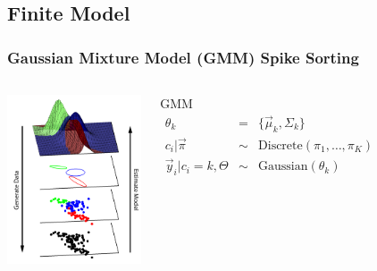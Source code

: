 \documentclass{beamer}
\begin{document}
\subsection{Finite Model}
\begin{frame}
\frametitle{ Gaussian Mixture Model (GMM) Spike Sorting \citep{Lewicki1994}}
\begin{columns}[top]
\begin{center}
		\includegraphics[height=5cm]{figures/generative_model_schematic.pdf}
\end{center}
\begin{block}{GMM}
{\tiny
\begin{eqnarray*}
\theta_k &=& \{\vec \mu_k,\Sigma_k\} \\
c_i | \vec \pi &\sim& \mbox{Discrete}(\pi_1, \ldots, \pi_K) \\
\vec y_i | c_i=k, \Theta &\sim& \mbox{Gaussian}(\theta_k) \\
\end{eqnarray*}
}
\end{block}
\end{columns}
\end{frame}
\end{document}
